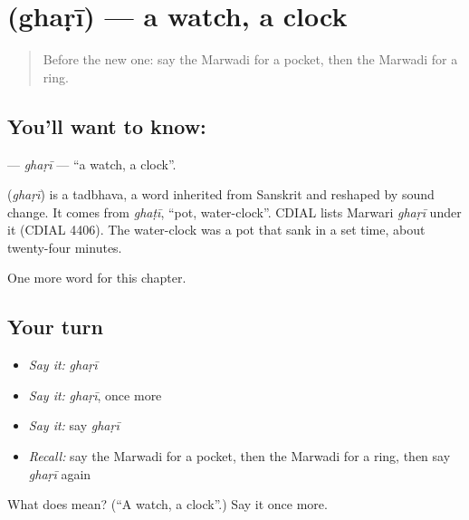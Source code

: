 \section[\texorpdfstring{\mw{घड़ी} (ghaṛī)}{घड़ी (ghaṛī)}]{ (ghaṛī) — a watch, a clock}

\label{lesson:MW-C85-ghari}



\begin{quote}
Before the new one: say the Marwadi for a pocket, then the Marwadi for a ring.
\end{quote}

\subsection*{You'll want to know: }
\textbf{} — \emph{ghaṛī} — \textquotedblleft{}a watch, a clock\textquotedblright{}.

\begin{cousinweb}
\textbf{} (\emph{ghaṛī}) is a tadbhava, a word inherited from Sanskrit and reshaped by sound change. It comes from \emph{ghaṭī}, \textquotedblleft{}pot, water-clock\textquotedblright{}. CDIAL lists Marwari \emph{ghaṛī} under it (CDIAL 4406). The water-clock was a pot that sank in a set time, about twenty-four minutes.
\end{cousinweb}

\begin{grammarlens}[title={What you've built}]
One more word for this chapter.
\end{grammarlens}

\subsection*{Your turn}
\begin{itemize}
\raggedright
  \item \emph{Say it:} \emph{ghaṛī}
  \item \emph{Say it:} \emph{ghaṛī}, once more
  \item \emph{Say it:} say \emph{ghaṛī}
  \item \emph{Recall:} say the Marwadi for a pocket, then the Marwadi for a ring, then say \emph{ghaṛī} again
\end{itemize}

\begin{tcolorbox}[breakable,colback=teal!4,colframe=teal!35!black,title={Before you move on}]
What does  mean? (\textquotedblleft{}A watch, a clock\textquotedblright{}.) Say it once more.
\end{tcolorbox}

